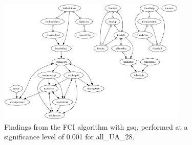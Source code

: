 \begin{figure}[htbp]
    \centering
    \includegraphics[width=0.8\textwidth]{Report/final_report/pictures/FCI_gsq_0.001_all_UA_28.png}
    \caption{Findings from the FCI algorithm with gsq, performed at a significance level of 0.001 for all_UA_28.}
    \label{fig:fci_gsq_0.001all_UA_28}
\end{figure}
